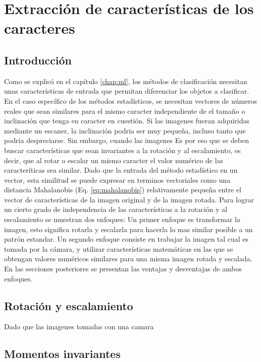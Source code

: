 \documentclass[a4paper, 11pt, oneside]{report}
\begin{document}
\chapter{Extracción de características de los caracteres}
\label{chap:features}

\section{Introducción}

Como se explicó en el capítulo \ref{chap:ml}, los métodos de clasificación necesitan unas características de entrada que permitan diferenciar los objetos a clasificar. En el caso específico de los métodos estadísticos, se necesitan vectores de números reales que sean similares para el mismo caracter independiente de el tamaño o inclinación que tenga en caracter en cuestión. Si las imagenes fueran adquiridas mediante un escaner, la inclinación podria ser muy pequeña, incluso tanto que podria despreciarse. Sin embargo, cuando las imagenes  Es por eso que se deben buscar características que sean invariantes a la rotación y al escalamiento, es decir, que al rotar o escalar un mismo caracter el valor numérico de las caracteríticas sea similar. Dado que la entrada del método estadístico en un vector, esta similitud se puede expresar en terminos vectoriales como una distancia Mahalanobis (Eq. \ref{eq:mahalanobis}) relativamente pequeña entre el vector de características de la imagen original y de la imagen rotada.\newline \newline
Para lograr un cierto grado de independencia de las características a la rotación y al escalamiento se muestran dos enfoques: Un primer enfoque es transformar la imagen, esto significa rotarla y escalarla para hacerla lo mas similar posible a un patrón estandar. Un segundo enfoque consiste en trabajar la imagen tal cual es tomada por la cámara, y utilizar características matemáticas en las que se obtengan valores numéricos similares para una misma imagen rotada y escalada. En las secciones posteriores se presentan las ventajas y desventajas de ambos enfoques.

\section{Rotación y escalamiento}

Dado que las imagenes tomadas con una camara

\section{Momentos invariantes}	
\label{sect:invariants}
\end{document}
